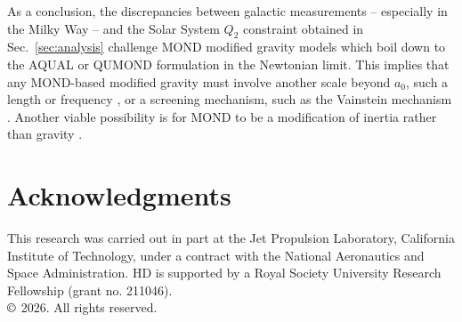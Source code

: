 \documentclass[reprint,nofootinbib,prd,aps]{revtex4-2}
\begin{document}
As a conclusion, the discrepancies between galactic measurements -- especially in the Milky Way -- and the Solar System $Q_2$ constraint obtained in Sec.~\ref{sec:analysis} challenge MOND modified gravity models which boil down to the AQUAL or QUMOND formulation in the Newtonian limit. This implies that any MOND-based modified gravity must involve another scale beyond $a_0$, such a length or frequency \cite{GQUMOND}, or a screening mechanism, such as the Vainstein mechanism \cite{babichev:2011uq}. Another viable possibility is for MOND to be a modification of inertia rather than gravity \cite{inertia,inertia2023}.

\section*{Acknowledgments}
This research was carried out in part at the Jet Propulsion Laboratory, California Institute of Technology, under a contract with the National Aeronautics and Space Administration. HD is supported by a Royal Society University Research Fellowship (grant no. 211046).\\
$\copyright$ 2026. All rights reserved.

\appendix
\end{document}
